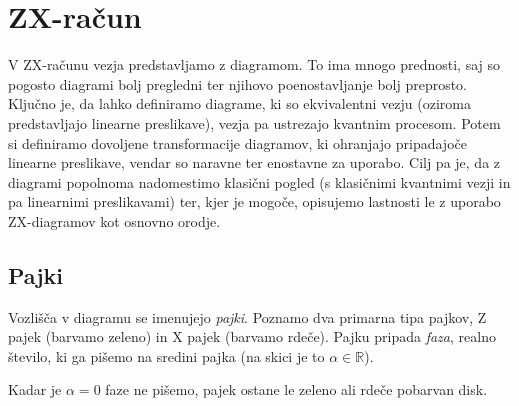 \documentclass[mat1]{fmfdelo}
\newcommand{\R}{\mathbb R}
\begin{document}

\section{ZX-račun}
V ZX-računu vezja predstavljamo z diagramom. To ima mnogo prednosti, saj so pogosto diagrami bolj pregledni ter njihovo poenostavljanje bolj preprosto. Ključno je, da lahko definiramo diagrame, ki so ekvivalentni vezju (oziroma predstavljajo linearne preslikave), vezja pa ustrezajo kvantnim procesom. Potem si definiramo dovoljene transformacije diagramov, ki ohranjajo pripadajoče linearne preslikave, vendar so naravne ter enostavne za uporabo. Cilj pa je, da z diagrami popolnoma nadomestimo klasični pogled (s klasičnimi kvantnimi vezji in pa linearnimi preslikavami) ter, kjer je mogoče, opisujemo lastnosti le z uporabo ZX-diagramov kot osnovno orodje.
\subsection{Pajki}
Vozlišča v diagramu se imenujejo \emph{pajki}. Poznamo dva primarna tipa pajkov, Z pajek (barvamo zeleno) in X pajek (barvamo rdeče). Pajku pripada \emph{faza}, realno število, ki ga pišemo na sredini pajka (na skici je to \(\alpha\in\R\)).
\begin{center}
\end{center}
Kadar je \(\alpha = 0\) faze ne pišemo, pajek ostane le zeleno ali rdeče pobarvan disk.
\end{document}
